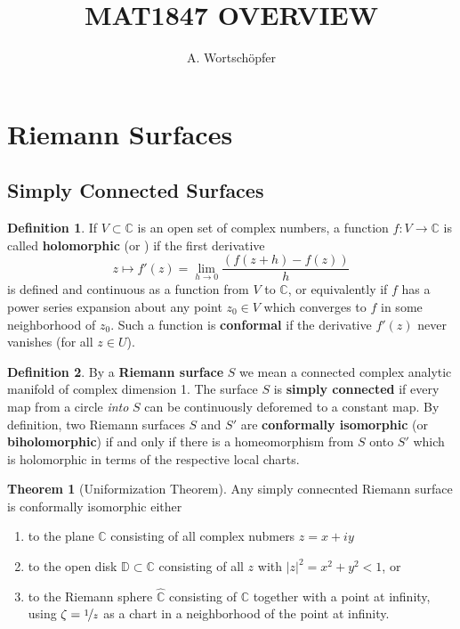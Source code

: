 \documentclass{article}
\title{MAT1847 OVERVIEW}
\author{A. Wortschöpfer}
\theoremstyle{definition}
\newtheorem{theorem}{Theorem}
\newtheorem{defn}{Definition}
\begin{document}
    \maketitle

    \section{Riemann Surfaces}

    \subsection{Simply Connected Surfaces}

    \begin{defn}
        If $V\subset\mathbb{C}$ is an open set of complex numbers, a function $f:V\to\mathbb{C}$ is called \textbf{holomorphic}
        (or ) if the first derivative
        \[ z\mapsto f'(z) = \lim_{h\to 0}\frac{(f(z+h)-f(z))}{h} \]
        is defined and continuous as a function from $V$ to $\mathbb{C}$, or equivalently if $f$ has a power series expansion
        about any point $z_0\in V$ which converges to $f$ in some neighborhood of $z_0$. Such a function is \textbf{conformal}
        if the derivative $f'(z)$ never vanishes (for all $z\in U$).
    \end{defn}

    \begin{defn}
        By a \textbf{Riemann surface} $S$ we mean a connected complex analytic manifold of complex dimension 1. The surface
        $S$ is \textbf{simply connected} if every map from a circle \textit{into} $S$ can be continuously deforemed to a constant
        map. By definition, two Riemann surfaces $S$ and $S'$ are \textbf{conformally isomorphic} (or \textbf{biholomorphic}) 
        if and only if there is a homeomorphism from $S$ onto $S'$ which is holomorphic in terms of the respective local charts.
    \end{defn}

    \begin{theorem}[Uniformization Theorem]
        Any simply connecnted Riemann surface is conformally isomorphic either
        \begin{enumerate}
            \item to the plane $\mathbb{C}$ consisting of all complex nubmers $z=x+iy$
            \item to the open disk $\mathbb{D}\subset\mathbb{C}$ consisting of all $z$ with $|z|^2 = x^2 + y^2 < 1$, or
            \item to the Riemann sphere $\hat{\mathbb{C}}$ consisting of $\mathbb{C}$ together with a point at infinity,
                using $\zeta = \nicefrac{1}{z}$ as a chart in a neighborhood of the point at infinity.
        \end{enumerate}
    \end{theorem}
\end{document}
